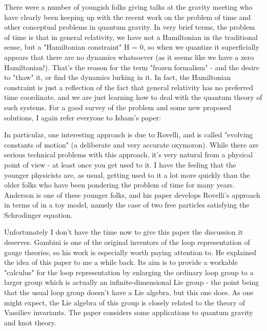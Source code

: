 

There were a number of youngish folks giving talks at the gravity meeting who have clearly been keeping up with the recent work on the problem of time and other conceptual problems in quantum gravity. In very brief terms, the problem of time is that in general relativity, we have not a Hamiltonian in the traditional sense, but a "Hamiltonian constraint" H = 0, so when we quantize it superficially appears that there are no dynamics whatsoever (as it seems like we have a zero Hamiltonian!). That's the reason for the term "frozen formalism" - and the desire to "thaw" it, or find the dynamics lurking in it. In fact, the Hamiltonian constraint is just a reflection of the fact that general relativity has no preferred time coordinate, and we are just learning how to deal with the quantum theory of such systems. For a good survey of the problem and some new proposed solutions, I again refer everyone to Isham's paper:


In particular, one interesting approach is due to Rovelli, and is called "evolving constants of motion" (a deliberate and very accurate oxymoron). While there are serious technical problems with this approach, it's very natural from a physical point of view - at least once you get used to it. I have the feeling that the younger physicists are, as usual, getting used to it a lot more quickly than the older folks who have been pondering the problem of time for many years. Anderson is one of these younger folks, and his paper develops Rovelli's approach in terms of in a toy model, namely the case of two free particles satisfying the Schrodinger equation.


Unfortunately I don't have the time now to give this paper the discussion it deserves. Gambini is one of the original inventors of the loop representation of gauge theories, so his work is especially worth paying attention to. He explained the idea of this paper to me a while back. Its aim is to provide a workable "calculus" for the loop representation by enlarging the ordinary loop group to a larger group which is actually an infinite-dimensional Lie group - the point being that the usual loop group doesn't have a Lie algebra, but this one does. As one might expect, the Lie algebra of this group is closely related to the theory of Vassiliev invariants. The paper considers some applications to quantum gravity and knot theory. 



